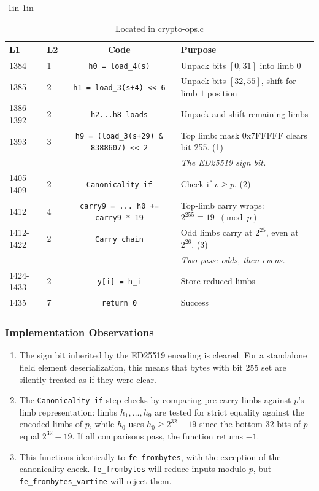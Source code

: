 \documentclass[12pt,titlepage,table]{article}
\begin{document}
\begin{table}[htbp]
\caption{fe\_frombytes\_vartime Source To Spec Map}
\begin{adjustwidth}{-1in}{-1in}
\centering
{
\begin{tabular}{| l | l | c | l |}
\hline
\textbf{L1} & \textbf{L2} & \textbf{Code} & \textbf{Purpose} \\
\hline
\hline
1384 &1& \verb+h0 = load_4(s)+ & Unpack bits $[0,31]$ into limb $0$ \\
1385 &2& \verb|h1 = load_3(s+4) << 6| & Unpack bits $[32,55]$, shift for limb $1$ position \\
1386-1392 &2& \verb+h2...h8 loads+ & Unpack and shift remaining limbs\\
1393 &3& \verb|h9 = (load_3(s+29) & 8388607) << 2| &Top limb: mask 0x7FFFFF clears bit 255. (1)  \\
&&& \textit{The ED25519 sign bit.}\\
1405-1409 &2& \verb|Canonicality if| & Check if $v \geq p$. (2) \\
1412 &4 & \verb|carry9 = ... h0 += carry9 * 19| & Top-limb carry wraps: $2^{255} \equiv 19 \, \, \, (\text{mod} \, \, \, p)$ \\
1412-1422 &2& \verb|Carry chain| & Odd limbs carry at $2^{25}$, even at $2^{26}$. (3) \\
&&& \textit{Two pass: odds, then evens.}\\
1424-1433 &2& \verb|y[i] = h_i| & Store reduced limbs\\
1435 &7& \verb|return 0| & Success\\
\hline
\end{tabular}}
\end{adjustwidth}
\caption*{Located in crypto-ops.c}
\end{table}

\subsubsection{Implementation Observations}
\begin{enumerate}
\item The sign bit inherited by the ED25519 encoding is cleared. For a standalone field element deserialization, this means that bytes with bit 255 set are silently treated as if they were clear.
\item The \verb+Canonicality if+ step checks by comparing pre-carry limbs against $p$'s limb representation: limbs $h_1, \dots, h_9$ are tested for strict equality against the encoded limbs of $p$, while $h_0$ uses $h_0 \geq 2^{32} - 19$ since the bottom $32$ bits of $p$ equal $2^{32} - 19$.  If all comparisons pass, the function returns $-1$.
\item This functions identically to \verb+fe_frombytes+, with the exception of the canonicality check. \verb+fe_frombytes+ will reduce inputs modulo $p$, but \verb+fe_frombytes_vartime+ will reject them.
\end{enumerate}
\end{document}
